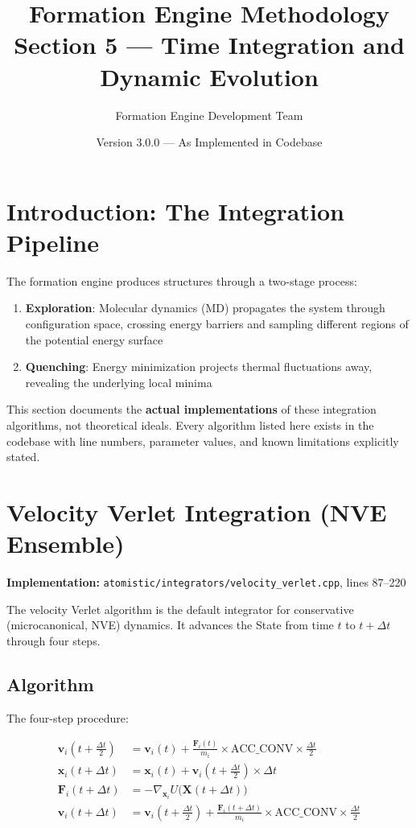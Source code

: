 \documentclass[11pt]{article}
\title{\textbf{Formation Engine Methodology} \\
\Large Section 5 — Time Integration and Dynamic Evolution}
\author{Formation Engine Development Team}
\date{Version 3.0.0 — As Implemented in Codebase}
\begin{document}
\maketitle

\section{Introduction: The Integration Pipeline}

The formation engine produces structures through a two-stage process:

\begin{enumerate}
\item \textbf{Exploration}: Molecular dynamics (MD) propagates the system through configuration space, crossing energy barriers and sampling different regions of the potential energy surface
\item \textbf{Quenching}: Energy minimization projects thermal fluctuations away, revealing the underlying local minima
\end{enumerate}

This section documents the \textbf{actual implementations} of these integration algorithms, not theoretical ideals. Every algorithm listed here exists in the codebase with line numbers, parameter values, and known limitations explicitly stated.

\section{Velocity Verlet Integration (NVE Ensemble)}

\textbf{Implementation:} \texttt{atomistic/integrators/velocity\_verlet.cpp}, lines 87--220

The velocity Verlet algorithm is the default integrator for conservative (microcanonical, NVE) dynamics. It advances the State from time $t$ to $t + \Delta t$ through four steps.

\subsection{Algorithm}

The four-step procedure:

\begin{align}
\mathbf{v}_i\!\left(t + \frac{\Delta t}{2}\right) &= \mathbf{v}_i(t) + \frac{\mathbf{F}_i(t)}{m_i} \times \text{ACC\_CONV} \times \frac{\Delta t}{2} \label{eq:vv_step1} \\
\mathbf{x}_i(t + \Delta t) &= \mathbf{x}_i(t) + \mathbf{v}_i\!\left(t + \frac{\Delta t}{2}\right) \times \Delta t \label{eq:vv_step2} \\
\mathbf{F}_i(t + \Delta t) &= -\nabla_{\mathbf{x}_i} U\bigl(\mathbf{X}(t + \Delta t)\bigr) \label{eq:vv_step3} \\
\mathbf{v}_i(t + \Delta t) &= \mathbf{v}_i\!\left(t + \frac{\Delta t}{2}\right) + \frac{\mathbf{F}_i(t + \Delta t)}{m_i} \times \text{ACC\_CONV} \times \frac{\Delta t}{2} \label{eq:vv_step4}
\end{align}
\end{document}
